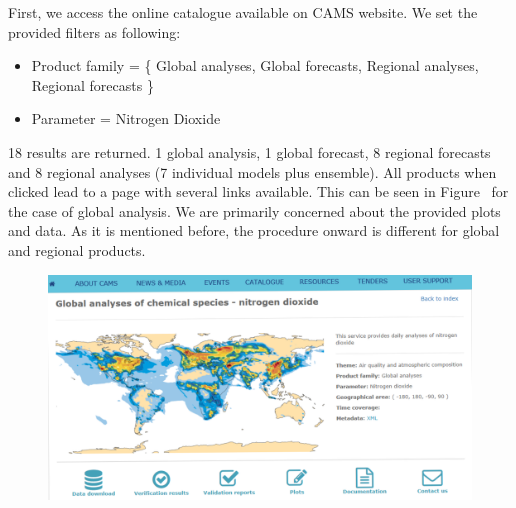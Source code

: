 \documentclass[9pt]{report}
\begin{document}
First, we access the online catalogue available on CAMS website. 
We set the provided filters as following: %

\begin{itemize}%

\item{}
Product family = \{ Global analyses, Global forecasts, Regional analyses, Regional forecasts \} %

\item{}
Parameter = Nitrogen Dioxide %
\end{itemize}%

\noindent{}18 results are returned. 1 global analysis, 1 global forecast, 8 regional forecasts and 8 regional analyses (7 individual models plus ensemble). 
All products when clicked lead to a page with several links available. This can be seen in Figure~ for the case of global analysis.
We are primarily concerned about the provided plots and data. 
As it is mentioned before, the procedure onward is different for global and regional products.%

\begin{figure}[h!]%
\begin{mdcenter}%

\noindent{}\includegraphics[keepaspectratio=true,width=\dimmin{}{\dimwidth{0.90}}]{images/catalogue}{}%

\mdhr{}%

\noindent{}%
\end{mdcenter}\label{cams-catalogue}%
\end{figure}%
\end{document}
